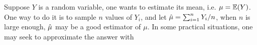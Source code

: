 \documentclass{iitthesis}
\theoremstyle{definition}
\begin{document}
 Suppose $Y$ is a random variable, one wants to estimate its mean, i.e. $\mu=\mathbb{E}(Y)$. One way to do it is to sample $n$ values of $Y_i$, and let $\hat{\mu}=\sum_{i=1}^n Y_i/n$, when $n$ is large enough, $\hat{\mu}$ may be a good estimator of $\mu$. In some practical situations, one may seek to approximate the answer with 
%
\end{document}
